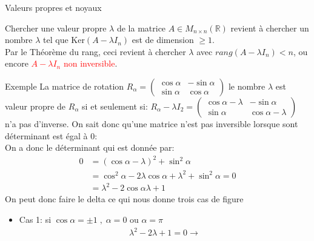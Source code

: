 \begin{parag}{Valeurs propres et noyaux}
\begin{subparag}
    Chercher une valeur propre $\lambda$ de la matrice $A \in M_{n \times n}(\mathbb{R})$ revient à chercher un nombre $\lambda$ tel que Ker$(A - \lambda I_n)$ est de dimension $\geq 1$.\\
    Par le Théorème du rang, ceci revient à chercher $\lambda$ avec $rang(A - \lambda I_n) < n$, ou encore \textcolor{red}{$A - \lambda I_n$ non inversible}.
\end{subparag}
\begin{subparag}{Exemple}
La matrice de rotation $R_\alpha = \begin{pmatrix}
    \cos \alpha & -\sin \alpha\\
    \sin \alpha & \cos \alpha
\end{pmatrix}$
    le nombre $\lambda$ est valeur propre de $R_\alpha$ si et seulement si:
    $R_\alpha - \lambda I_2 = \begin{pmatrix}
        \cos \alpha - \lambda & -\sin \alpha\\
        \sin \alpha& \cos \alpha - \lambda
    \end{pmatrix}$ n'a pas d'inverse. On sait donc qu'une matrice n'est pas inversible lorsque sont déterminant est égal à $0$:
    \\
    On a donc le déterminant qui est donnée par:
    \begin{align*}
    0 &= (\cos \alpha - \lambda)^2 + \sin^2 \alpha \\
    &= \cos^2\alpha - 2\lambda\cos\alpha + \lambda^2 + \sin^2\alpha = 0\\
    &= \lambda^2 -2\cos\alpha \lambda + 1
    \end{align*}
    On peut donc faire le delta ce qui nous donne trois cas de figure
    \begin{itemize}
        \item Cas 1: si $\cos\alpha = \pm 1\; , \; \alpha = 0 \text{ ou }\alpha = \pi $\\
        \begin{align*}
            \lambda^2 - 2\lambda + 1 = 0 \to 
        \end{align*}
    \end{itemize}
    

\end{subparag}
\end{parag}
